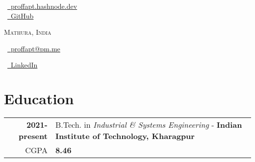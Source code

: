 \documentclass[a4paper,10pt]{extarticle} %
\begin{document}
\pagestyle{empty} %

\begin{multicols}{3}

\normalsize  \faGlobe\ {\href{https://proffapt.hashnode.dev/}{\  proffapt.hashnode.dev}}\\
\normalsize \faGithub\ {\href{https://github.com/proffapt}{\  GitHub}}\\
\columnbreak
\normalsize\par{\centering{\huge\textsc{\textcolor{primary}{Arpit Bhardwaj}}}\par} 
\par{\centering\normalsize {\textsc{Mathura, India}}\hfill\par}
\columnbreak
\raggedright\hfill\normalsize \faEnvelope\ {\href{mailto:proffapt@pm.me}{\  proffapt@pm.me}}\\
\raggedright\hfill\normalsize \faLinkedinSquare\ {\href{https://www.linkedin.com/in/proffapt}{\  LinkedIn}}\\
\end{multicols}
\vspace{-0.4 cm}

\section{\textcolor{primary}{Education}}
\vspace{+0.2cm}

\begin{tabular}{r|p{17.5cm}}	

 \textbf{2021-present} & B.Tech. in \textit{Industrial \& Systems Engineering} - \textbf{Indian Institute of Technology, Kharagpur}\\
 \hfill CGPA & \textbf{8.46}\\
 
\end{tabular}

\vspace{+0.2cm}
\end{document}

